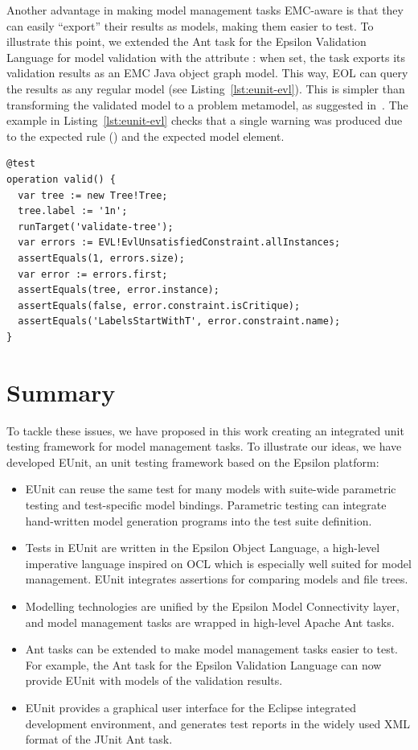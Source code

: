 Another advantage in making model management tasks EMC-aware is that they can easily ``export'' their results as models, making them easier to test. To illustrate this point, we extended the Ant task for the Epsilon Validation Language for model validation with the attribute : when set, the task exports its validation results as an EMC Java object graph model. This way, EOL can query the results as any regular model (see Listing~\ref{lst:eunit-evl}). This is simpler than transforming the validated model to a problem metamodel, as suggested in~\cite{Jouault2005}. The example in Listing~\ref{lst:eunit-evl} checks that a single warning was produced due to the expected rule () and the expected model element.

\begin{lstlisting}[language=EOL,caption=Testing an EVL model validation with EUnit,label=lst:eunit-evl,float]
@test
operation valid() {
  var tree := new Tree!Tree;
  tree.label := '1n';
  runTarget('validate-tree');
  var errors := EVL!EvlUnsatisfiedConstraint.allInstances;
  assertEquals(1, errors.size);
  var error := errors.first;
  assertEquals(tree, error.instance);
  assertEquals(false, error.constraint.isCritique);
  assertEquals('LabelsStartWithT', error.constraint.name);
}
\end{lstlisting}

\section{Summary}

To tackle these issues, we have proposed in this work creating an integrated unit testing framework for model management tasks. To illustrate our ideas, we have developed EUnit, an unit testing framework based on the Epsilon platform:
\begin{itemize}
\item EUnit can reuse the same test for many models with suite-wide parametric testing and test-specific model bindings. Parametric testing can integrate hand-written model generation programs into the test suite definition.

\item Tests in EUnit are written in the Epsilon Object Language, a high-level imperative language inspired on OCL which is especially well suited for model management. EUnit integrates assertions for comparing models and file trees.

\item Modelling technologies are unified by the Epsilon Model Connectivity layer, and model management tasks are wrapped in high-level Apache Ant tasks.

\item Ant tasks can be extended to make model management tasks easier to test. For example, the Ant task for the Epsilon Validation Language can now provide EUnit with models of the validation results.

\item EUnit provides a graphical user interface for the Eclipse integrated development environment, and generates test reports in the widely used XML format of the JUnit Ant task.
\end{itemize}

